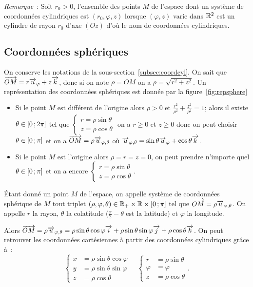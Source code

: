 \emph{Remarque}~: Soit \(r_0>0\), l'ensemble des points \(M\) de l'espace dont un système de coordonnées cylindriques est \((r_0,\varphi,z)\) lorsque \((\varphi,z)\) varie dans \(\mathbb{R}^2\) est un cylindre de rayon \(r_0\) d'axe \((Oz)\) d'où le nom de coordonnées cylindriques.


\subsection{Coordonnées sphériques}
On conserve les notations de la sous-section~\ref{subsec:coordcyl}. On sait que \(\overrightarrow{OM}=r\overrightarrow{u}_\varphi+z\overrightarrow{k}\), donc si on note \(\rho=OM\) on a \(\rho=\sqrt{r^2+z^2}\). Un représentation des coordonnées sphériques est donnée par la figure~\ref{fig:repsphere}
\begin{itemize}
\item Si le point \(M\) est différent de l'origine alors \(\rho>0\) et \(\frac{r^2}{\rho^2}+\frac{z^2}{\rho^2}=1\); alors il existe \(\theta\in \left[ 0 \, ;  2\pi \right]\) tel que \(\begin{cases}r=\rho\sin\theta\\ z=\rho\cos\theta\end{cases}\) on a \(r\geqslant 0\) et \(z\geqslant 0\) donc on peut choisir \(\theta\in \left[ 0 \, ;  \pi \right]\) et on a \(\overrightarrow{OM}=\rho\overrightarrow{u}_{\varphi,\theta}\) où \(\overrightarrow{u}_{\varphi,\theta}=\sin\theta\overrightarrow{u}_\varphi+\cos\theta\overrightarrow{k}\).
\item Si le point \(M\) est l'origine alors \(\rho=r=z=0\), on peut prendre n'importe quel \(\theta \in \left[ 0 \, ;  \pi \right]\) et on a encore \(\begin{cases}r=\rho\sin\theta\\ z=\rho\cos\theta\end{cases}\).
\end{itemize}
\begin{defdef}
  Étant donné un point \(M\) de l'espace, on appelle système de coordonnées sphérique de \(M\) tout triplet \((\rho,\varphi,\theta)\in\mathbb{R}_{+} \times \mathbb{R} \times \left[ 0 \, ;  \pi \right]\) tel que \(\overrightarrow{OM}=\rho\overrightarrow{u}_{\varphi,\theta}\). On appelle \(r\) la rayon, \(\theta\) la colatitude (\(\frac{\pi}{2}-\theta\) est la latitude) et \(\varphi\) la longitude.
\end{defdef}
Alors \(\overrightarrow{OM}=\rho\overrightarrow{u}_{\varphi,\theta}=\rho\sin\theta\cos\varphi\overrightarrow{i}+\rho\sin\theta\sin\varphi\overrightarrow{j}+\rho\cos\theta\overrightarrow{k}\). On peut retrouver les coordonnées cartésiennes à partir des coordonnées cylindriques grâce à~:
\begin{equation}
  \begin{cases}
    x&=\rho\sin\theta\cos\varphi\\ y&=\rho\sin\theta\sin\varphi\\ z&=\rho\cos\theta
  \end{cases}
\quad
  \begin{cases}
    r&=\rho\sin\theta\\ \varphi&=\varphi\\ z&=\rho\cos\theta
  \end{cases}.
\end{equation}
